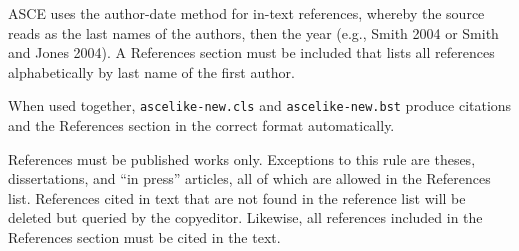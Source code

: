 \documentclass[Journal,letterpaper]{ascelike-new}
\begin{document}
ASCE uses the author-date method for in-text references, whereby the source reads as the last names of the authors, then the year (e.g., Smith 2004 or Smith and Jones 2004). A References section must be included that lists all references alphabetically by last name of the first author. 

When used together, \texttt{ascelike-new.cls} and \texttt{ascelike-new.bst} produce citations and the References section in the correct format automatically.

References must be published works only. Exceptions to this rule are theses, dissertations, and ``in press'' articles, all of which are allowed in the References list. References cited in text that are not found in the reference list will be deleted but queried by the copyeditor. Likewise, all references included in the References section must be cited in the text.
\end{document}
